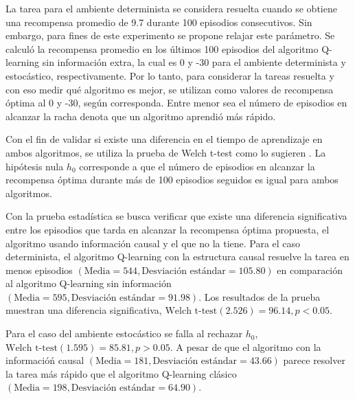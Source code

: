 La tarea para el ambiente determinista se considera resuelta cuando se obtiene una recompensa promedio de 9.7 durante 100 episodios consecutivos. Sin embargo, para fines de este experimento se propone relajar este parámetro. Se calculó la recompensa promedio en los últimos 100 episodios del algoritmo Q-learning sin información extra, la cual es 0 y -30 para el ambiente determinista y estocástico, respectivamente. Por lo tanto, para considerar la tareas resuelta y con eso medir qué algoritmo es mejor, se utilizan como valores de recompensa óptima al 0 y -30, según corresponda. 
Entre menor sea el número de episodios en alcanzar la racha denota que un algoritmo aprendió más rápido.


Con el fin de validar si existe una diferencia en el tiempo
de aprendizaje en ambos algoritmos, se utiliza la prueba de Welch t-test como lo sugieren \citet{colas2019hitchhikers}. 
La hipótesis nula $h_0$ corresponde a que el número de episodios en alcanzar la recompensa óptima durante más de 100 episodios seguidos es igual para ambos algoritmos. 

Con la prueba estadística se busca verificar que existe una diferencia
significativa entre los episodios que tarda en alcanzar la recompensa óptima propuesta, el algoritmo usando información causal y el 
que no la tiene. Para el caso determinista, el algoritmo Q-learning
con la estructura causal resuelve la tarea en menos episodios $(\text{Media} = 544, \text{Desviación estándar} = 105.80)$ en comparación al algoritmo
Q-learning sin información $(\text{Media} = 595, \text{Desviación estándar} = 91.98)$. Los resultados de la prueba muestran una diferencia significativa,
$\text{Welch t-test} (2.526) = 96.14, p < 0.05$.


Para el caso del ambiente estocástico se falla al rechazar $h_0$, $\text{Welch t-test} (1.595) = 85.81, p > 0.05$. A pesar de que
el algoritmo con la informacióń causal $(\text{Media} = 181, \text{Desviación estándar} = 43.66)$  parece resolver la
tarea más rápido que el algoritmo Q-learning clásico $(\text{Media} = 198, \text{Desviación estándar} = 64.90)$. 

